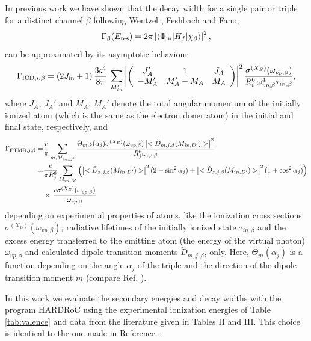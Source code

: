 In previous work \cite{Fasshauer13,Fasshauer_thesis} we have shown that
the decay width for a single pair or triple for a distinct channel $\beta$
following Wentzel \cite{Wentzel27}, Feshbach\cite{Feshbach58,Feshbach62}
and Fano,\cite{Fano61}
%
\begin{equation}
 \Gamma_{\beta}(E_{\rm res}) = 2\pi \left|
                           \braket{\Phi_{\rm in}| H_f |\chi_{\beta}}
                           \right|^2,
\end{equation}
%
can be approximated by its asymptotic behaviour
%
\begin{equation}
 \Gamma_{{\rm ICD},i,\beta} = (2J_{\rm in}+1)\, \frac{3c^4}{8\pi}\,
                        \sum\limits_{M_{in}'}
                        \left| \left(
                        \begin{array}{ccc}
                        J_A'  & 1        & J_A\\
                        -M_A' & M_A'-M_A & M_A
                        \end{array}\right) \right|^2
                        \frac{\sigma^{(X_E)}(\omega_{vp,\beta})}
                        {R_i^6 \, \omega_{vp,\beta}^4 \tau_{in,\beta}},
\end{equation}
%
where $J_A$, $J_A'$ and $M_A$, $M_A'$ denote the total angular momentum of the
initially ionized atom (which is the same as the electron doner atom) in the
initial and final state, respectively,
and
%
\begin{align}
 \Gamma_{{\rm ETMD},j,\beta} =& \frac{c}{\pi} \sum\limits_{m,M_{in,D'}}
                        \frac{\Theta_{m,k}(\alpha_j) \sigma^{(X_E)}(\omega_{vp,\beta})
                              \left| <\tilde{D}_{m,j,\beta}(M_{in,D'})>\right|^2}
                         {R_j^6 \omega_{vp,\beta}}\\
               =& \frac{c}{\pi R_j^6}
               \sum\limits_{M_{in,D'}}
               \left( \left| <\tilde{D}_{x,j,\beta} (M_{in,D'}) > \right|^2
                 (2+ \sin^2\alpha_j)
               + \left| <\tilde{D}_{z,j,\beta} (M_{in,D'}) > \right|^2
                 (1+\cos^2\alpha_j) \right) \nonumber \\
           & \times\, \frac{c\sigma^{(X_E)}(\omega_{vp,\beta})}{\omega_{vp,\beta}}
\end{align}
%
depending on 
experimental properties
of atoms, like the ionization cross sections
$\sigma^{(X_E)}(\omega_{vp,\beta})$, radiative lifetimes of the initially
ionized state $\tau_{in,\beta}$ and the excess energy transferred to the
emitting atom (the energy of the virtual photon) $\omega_{vp,\beta}$
and calculated dipole transition moments $\tilde{D}_{m,j,\beta}$, only.
Here, $\Theta_{m}(\alpha_j)$ is a function depending on the angle $\alpha_j$
of the triple and the direction of the dipole
transition moment $m$
(compare Ref. \cite{Fasshauer13}).

In this work we evaluate the secondary energies and decay widths with
the program HARDRoC \cite{HARDRoC,fasshauer2014} using the
experimental ionization energies of Table \ref{tab:valence}
and data from the literature given in Tables II and III.
This choice is identical to the one made in Reference \cite{Fasshauer13}.
